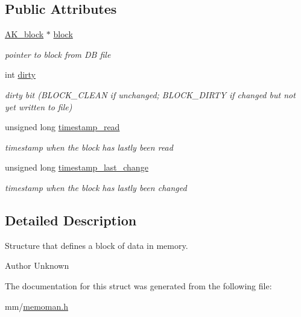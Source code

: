 \subsection*{Public Attributes}
\begin{DoxyCompactItemize}
\item 
\mbox{\label{structAK__mem__block_afe6bab88220d9357348e69f812d024b4}} 
\hyperlink{structAK__block}{A\+K\+\_\+block} $\ast$ \hyperlink{structAK__mem__block_afe6bab88220d9357348e69f812d024b4}{block}
\begin{DoxyCompactList}\small\item\em pointer to block from DB file \end{DoxyCompactList}\item 
\mbox{\label{structAK__mem__block_a9d5dce682d27f9916b9e42d7ca159e68}} 
int \hyperlink{structAK__mem__block_a9d5dce682d27f9916b9e42d7ca159e68}{dirty}
\begin{DoxyCompactList}\small\item\em dirty bit (B\+L\+O\+C\+K\+\_\+\+C\+L\+E\+AN if unchanged; B\+L\+O\+C\+K\+\_\+\+D\+I\+R\+TY if changed but not yet written to file) \end{DoxyCompactList}\item 
\mbox{\label{structAK__mem__block_a2ad2ddb6c30f91bdff3af10886ab9e7a}} 
unsigned long \hyperlink{structAK__mem__block_a2ad2ddb6c30f91bdff3af10886ab9e7a}{timestamp\+\_\+read}
\begin{DoxyCompactList}\small\item\em timestamp when the block has lastly been read \end{DoxyCompactList}\item 
\mbox{\label{structAK__mem__block_ad575095cfe45be3ed7f466c4239d6bda}} 
unsigned long \hyperlink{structAK__mem__block_ad575095cfe45be3ed7f466c4239d6bda}{timestamp\+\_\+last\+\_\+change}
\begin{DoxyCompactList}\small\item\em timestamp when the block has lastly been changed \end{DoxyCompactList}\end{DoxyCompactItemize}


\subsection{Detailed Description}
Structure that defines a block of data in memory. 

\begin{DoxyAuthor}{Author}
Unknown 
\end{DoxyAuthor}


The documentation for this struct was generated from the following file\+:\begin{DoxyCompactItemize}
\item 
mm/\hyperlink{memoman_8h}{memoman.\+h}\end{DoxyCompactItemize}
